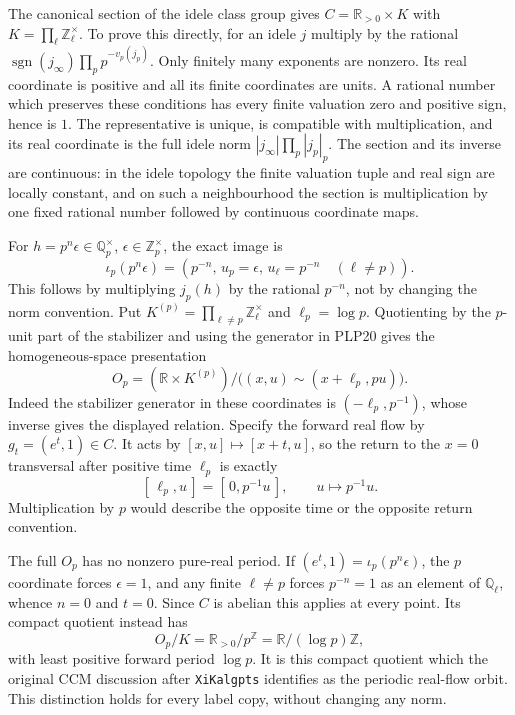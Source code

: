 The canonical section of the idele class group gives
$C=\mathbb R_{>0}\times K$ with
$K=\prod_\ell\mathbb Z_\ell^\times$. To prove this directly, for
an idele $j$ multiply by the rational
$\operatorname{sgn}(j_\infty)\prod_p p^{-v_p(j_p)}$.
Only finitely many exponents are nonzero. Its real coordinate is
positive and all its finite coordinates are units. A rational
number which preserves these conditions has every finite valuation
zero and positive sign, hence is $1$. The representative is unique,
is compatible with multiplication, and its real coordinate is the
full idele norm $|j_\infty|\prod_p|j_p|_p$.
The section and its inverse are continuous: in the idele topology
the finite valuation tuple and real sign are locally constant, and
on such a neighbourhood the section is multiplication by one
fixed rational number followed by continuous coordinate maps.

For $h=p^n\epsilon\in\mathbb Q_p^\times$,
$\epsilon\in\mathbb Z_p^\times$, the exact image is
\begin{equation}\tag{PLP20}
\iota_p(p^n\epsilon)=
\left(p^{-n},\,u_p=\epsilon,\,
u_\ell=p^{-n}\quad(\ell\ne p)\right).
\end{equation}
This follows by multiplying $j_p(h)$ by the rational $p^{-n}$,
not by changing the norm convention. Put
$K^{(p)}=\prod_{\ell\ne p}\mathbb Z_\ell^\times$ and
$\ell_p=\log p$. Quotienting by the $p$-unit part of the stabilizer
and using the generator in PLP20 gives the homogeneous-space
presentation
\begin{equation}\tag{PLP21}
O_p=(\mathbb R\times K^{(p)})/
\bigl((x,u)\sim(x+\ell_p,pu)\bigr).
\end{equation}
Indeed the stabilizer generator in these coordinates is
$(-\ell_p,p^{-1})$, whose inverse gives the displayed relation.
Specify the forward real flow by $g_t=(e^t,1)\in C$.
It acts by $[x,u]\mapsto[x+t,u]$, so the return to the
$x=0$ transversal after positive time $\ell_p$ is exactly
\begin{equation}\tag{PLP22}
[\,\ell_p,u\,]=[\,0,p^{-1}u\,],\qquad
u\longmapsto p^{-1}u .
\end{equation}
Multiplication by $p$ would describe the opposite time or the
opposite return convention.

The full $O_p$ has no nonzero pure-real period. If
$(e^t,1)=\iota_p(p^n\epsilon)$, the $p$ coordinate forces
$\epsilon=1$, and any finite $\ell\ne p$ forces $p^{-n}=1$
as an element of $\mathbb Q_\ell$, whence $n=0$ and $t=0$.
Since $C$ is abelian this applies at every point. Its compact
quotient instead has
\begin{equation}\tag{PLP23}
O_p/K=\mathbb R_{>0}/p^{\mathbb Z}
=\mathbb R/(\log p)\mathbb Z ,
\end{equation}
with least positive forward period $\log p$. It is this compact
quotient which the original CCM discussion after \texttt{XiKalgpts}
identifies as the periodic real-flow orbit. This distinction holds
for every label copy, without changing any norm.

